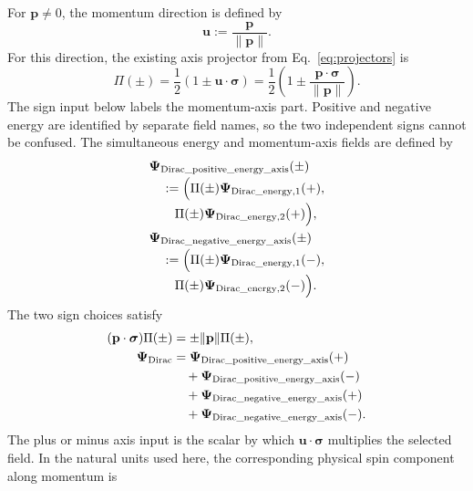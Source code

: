 \documentclass[10pt,letterpaper]{article}
\let\STAamsmathtext\text
\newcommand{\eqtext}[1]{\STAamsmathtext{\normalfont\rmfamily #1}}
\renewcommand{\text}[1]{\STAamsmathtext{\normalfont\rmfamily #1}}
\newcommand{\pv}[1]{#1}
\newcommand{\vct}[1]{\mathbf{#1}}
\newcommand{\sigv}{\vct{\pv{\bm{\sigma}}}}
\newcommand{\bPsi}{\pv{\bm{\Psi}}}
\begin{document}
For \(\vct{p}\ne0\), the momentum direction is defined by
\begin{equation}
\vct{u}:=\frac{\vct{p}}{\|\vct{p}\|}.
\label{eq:momentum-axis}
\end{equation}
For this direction, the existing axis projector from
Eq.\ \eqref{eq:projectors} is
\begin{equation}
\pv{\Pi}(\pm)
=\frac12(1\pm\vct{u}\cdot\sigv)
=\frac12\left(1\pm\frac{\vct{p}\cdot\sigv}{\|\vct{p}\|}\right).
\label{eq:momentum-axis-projector}
\end{equation}
The sign input below labels the momentum-axis part. Positive and negative
energy are identified by separate field names, so the two independent signs
cannot be confused.
The simultaneous energy and momentum-axis fields are defined by
\begin{equation}
\begin{aligned}
&\bPsi_{\eqtext{Dirac\_positive\_energy\_axis}}(\pm)\\[-0.2em]
&\quad:=\Bigl(
\pv{\Pi}(\pm)\bPsi_{\eqtext{Dirac\_energy},1}(+),\\[-0.2em]
&\qquad
\pv{\Pi}(\pm)\bPsi_{\eqtext{Dirac\_energy},2}(+)
\Bigr),\\
&\bPsi_{\eqtext{Dirac\_negative\_energy\_axis}}(\pm)\\[-0.2em]
&\quad:=\Bigl(
\pv{\Pi}(\pm)\bPsi_{\eqtext{Dirac\_energy},1}(-),\\[-0.2em]
&\qquad
\pv{\Pi}(\pm)\bPsi_{\eqtext{Dirac\_energy},2}(-)
\Bigr).
\end{aligned}
\label{eq:energy-spin-projectors}
\end{equation}
The two sign choices satisfy
\begin{equation}
\begin{aligned}
(\vct{p}\cdot\sigv)\pv{\Pi}(\pm)
&=\pm\|\vct{p}\|\pv{\Pi}(\pm),\\
\bPsi_{\eqtext{Dirac}}
&=\bPsi_{\eqtext{Dirac\_positive\_energy\_axis}}(+)\\
&\quad+\bPsi_{\eqtext{Dirac\_positive\_energy\_axis}}(-)\\
&\quad+\bPsi_{\eqtext{Dirac\_negative\_energy\_axis}}(+)\\
&\quad+\bPsi_{\eqtext{Dirac\_negative\_energy\_axis}}(-).
\end{aligned}
\label{eq:energy-spin-reconstruction}
\end{equation}
The plus or minus axis input is the scalar by which
\(\vct{u}\cdot\sigv\) multiplies the selected field. In the natural units
used here, the corresponding physical spin component along momentum is
\end{document}
